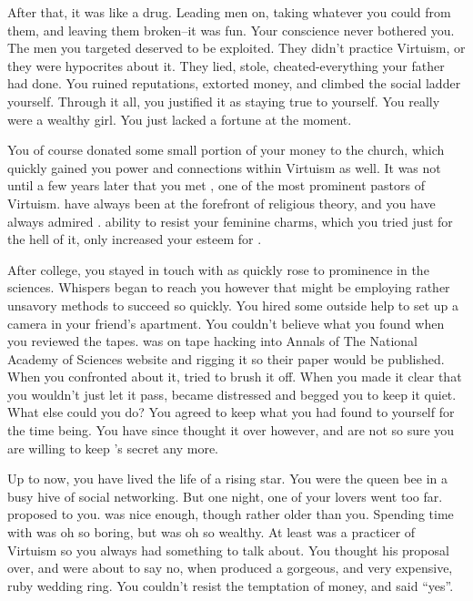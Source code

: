 \documentclass[char]{guildcamp1}
\begin{document}
After that, it was like a drug. Leading men on, taking whatever you could from them, and leaving them broken--it was fun. Your conscience never bothered you. The men you targeted deserved to be exploited. They didn't practice Virtuism, or they were hypocrites about it. They lied, stole, cheated-everything your father had done. You ruined reputations, extorted money, and climbed the social ladder yourself. Through it all, you justified it as staying true to yourself. You really were a wealthy girl. You just lacked a fortune at the moment.  

You of course donated some small portion of your money to the church, which quickly gained you power and connections within Virtuism as well. It was not until a few years later that you met \cPastor{}, one of the most prominent pastors of Virtuism. \cPastor{\They} have always been at the forefront of religious theory, and you have always admired \cPastor{\them}. \cPastor{\them} ability to resist your feminine charms, which you tried just for the hell of it, only increased your esteem for \cPastor{}. 

After college, you stayed in touch with \cRival{} as \cRival{\they} quickly rose to prominence in the sciences. Whispers began to reach you however that \cRival{} might be employing rather unsavory methods to succeed so quickly. You hired some outside help to set up a camera in your friend's apartment. You couldn't believe what you found when you reviewed the tapes. \cRival{} was on tape hacking into Annals of The National Academy of Sciences website and rigging it so their paper would be published. When you confronted \cRival{\them} about it, \cRival{\they} tried to brush it off. When you made it clear that you wouldn't just let it pass, \cRival{} became distressed and begged you to keep it quiet.  What else could you do? You agreed to keep what you had found to yourself for the time being. You have since thought it over however, and are not so sure you are willing to keep \cRival{}'s secret any more.

Up to now, you have lived the life of a rising star. You were the queen bee in a busy hive of social networking. But one night, one of your lovers went too far. \cGroomA{} proposed to you. \cGroomA{\They} was nice enough, though rather older than you. Spending time with \cGroomA{\them} was oh so boring, but \cGroomA{\they} was oh so wealthy. At least \cGroomA{\they} was  a practicer of Virtuism so you always had something to talk about. You thought his proposal over, and were about to say no, when \cGroomA{\they} produced a gorgeous, and very expensive, ruby wedding ring. You couldn't resist the temptation of money, and said ``yes''.
\end{document}
